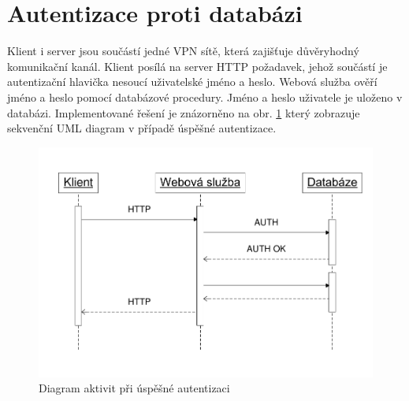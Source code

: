 \documentclass{diplomka}
\begin{document}
\section{Autentizace proti databázi}
Klient i server jsou součástí jedné VPN sítě, která zajišťuje důvěryhodný komunikační kanál.  Klient posílá na server HTTP požadavek, jehož součástí je autentizační hlavička nesoucí uživatelské jméno a heslo. Webová služba ověří jméno a heslo pomocí databázové procedury. Jméno a heslo uživatele je uloženo v databázi. Implementované řešení je znázorněno na obr. \ref{fig:auth} který zobrazuje sekvenční UML diagram v případě úspěšné autentizace.
\begin{figure}[H]
  \centering
  \includegraphics[scale=0.8]{visio/auth.pdf}
\caption{Diagram aktivit při úspěšné autentizaci}
\label{fig:auth}
\end{figure}
\end{document}
